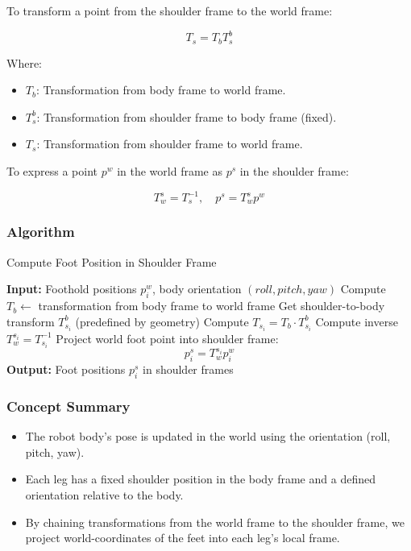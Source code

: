 \documentclass[a4paper,11pt]{article}
\begin{document}
To transform a point from the shoulder frame to the world frame:

\[
T_s = T_b T_s^b
\]

Where:
\begin{itemize}
    \item $T_b$: Transformation from body frame to world frame.
    \item $T_s^b$: Transformation from shoulder frame to body frame (fixed).
    \item $T_s$: Transformation from shoulder frame to world frame.
\end{itemize}

To express a point $p^w$ in the world frame as $p^s$ in the shoulder frame:

\[
T_w^s = T_s^{-1}, \quad p^s = T_w^s p^w
\]

\subsubsection*{Algorithm}
\begin{algorithm}[H]
\caption{Compute Foot Position in Shoulder Frame}
\begin{algorithmic}[1]
\State \textbf{Input:} Foothold positions $p^w_i$, body orientation $(roll, pitch, yaw)$
\State Compute $T_b \gets$ transformation from body frame to world frame
    \State Get shoulder-to-body transform $T_{s_i}^b$ (predefined by geometry)
    \State Compute $T_{s_i} = T_b \cdot T_{s_i}^b$
    \State Compute inverse $T_w^{s_i} = T_{s_i}^{-1}$
    \State Project world foot point into shoulder frame:
    \[
    p_i^s = T_w^{s_i} p_i^w
    \]
\EndFor
\State \textbf{Output:} Foot positions $p_i^s$ in shoulder frames
\end{algorithmic}
\end{algorithm}

\subsubsection*{Concept Summary}
\begin{itemize}
	\item The robot body's pose is updated in the world using the orientation (roll, pitch, yaw).
	\item Each leg has a fixed shoulder position in the body frame and a defined orientation relative to the body.
	\item By chaining transformations from the world frame to the shoulder frame, we project world-coordinates of the feet into each leg's local frame.
\end{itemize}
\end{document}
